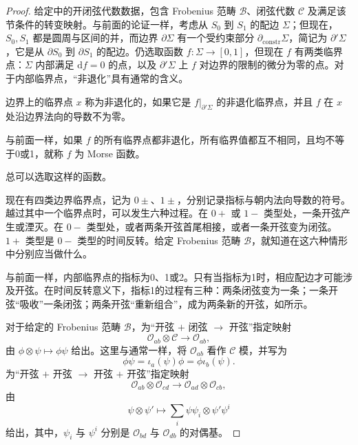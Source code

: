 \begin{proof}
给定中的开闭弦代数数据，包含 Frobenius 范畴 $\mathcal{B}$、闭弦代数 $\mathcal{C}$ 及满足该节条件的转变映射。与前面的论证一样，考虑从 $S_0$ 到 $S_1$ 的配边 $\Sigma$；但现在，$S_0,S_1$ 都是圆周与区间的并，而边界 $\partial\Sigma$ 有一个受约束部分 $\partial_{\mathrm{constr}}\Sigma$，简记为 $\partial'\Sigma$，它是从 $\partial S_0$ 到 $\partial S_1$ 的配边。仍选取函数 $f\colon\Sigma\to[0,1]$，但现在 $f$ 有两类临界点：$\Sigma$ 内部满足 $\mathrm{d}f=0$ 的点，以及 $\partial'\Sigma$ 上 $f$ 对边界的限制的微分为零的点。对于内部临界点，“非退化”具有通常的含义。
\begin{definition*}\label{def:2.boundary-critical}
边界上的临界点 $x$ 称为非退化的，如果它是 $f|_{\partial'\Sigma}$ 的非退化临界点，并且 $f$ 在 $x$ 处沿边界法向的导数不为零。
\end{definition*}

\begin{definition*}\label{def:2.boundary-morse}
与前面一样，如果 $f$ 的所有临界点都非退化，所有临界值都互不相同，且均不等于0或1，就称 $f$ 为 Morse 函数。
\end{definition*}
总可以选取这样的函数。

现在有四类边界临界点，记为 $0\pm$、$1\pm$，分别记录指标与朝内法向导数的符号。越过其中一个临界点时，可以发生六种过程。在 $0+$ 或 $1-$ 类型处，一条开弦产生或湮灭。在 $0-$ 类型处，或者两条开弦首尾相接，或者一条开弦变为闭弦。$1+$ 类型是 $0-$ 类型的时间反转。给定 Frobenius 范畴 $\mathcal{B}$，就知道在这六种情形中分别应当做什么。

\begin{figure}[H]
\centering
{}
\BookNumberOnlyCaption\label{fig:2.36}
\end{figure}

与前面一样，内部临界点的指标为0、1或2。只有当指标为1时，相应配边才可能涉及开弦。在时间反转意义下，指标1的过程有三种：两条闭弦变为一条；一条开弦“吸收”一条闭弦；两条开弦“重新组合”，成为两条新的开弦，如所示。

对于给定的 Frobenius 范畴 $\mathcal{B}$，为“开弦 $+$ 闭弦 $\to$ 开弦”指定映射
\[
\mathcal{O}_{ab}\otimes\mathcal{C}\longrightarrow\mathcal{O}_{ab},
\]
由 $\phi\otimes\psi\mapsto\phi\psi$ 给出。这里与通常一样，将 $\mathcal{O}_{ab}$ 看作 $\mathcal{C}$ 模，并写为
\[
\phi\psi=\iota_a(\psi)\phi=\phi\iota_b(\psi).
\]
为“开弦 $+$ 开弦 $\to$ 开弦 $+$ 开弦”指定映射
\[
\mathcal{O}_{ab}\otimes\mathcal{O}_{cd}\longrightarrow\mathcal{O}_{ad}\otimes\mathcal{O}_{cb},
\]
由
\[
\psi\otimes\psi'\longmapsto\sum_i\psi\psi_i\otimes\psi'\psi^i
\]
给出，其中，$\psi_i$ 与 $\psi^i$ 分别是 $\mathcal{O}_{bd}$ 与 $\mathcal{O}_{db}$ 的对偶基。


\end{proof}
